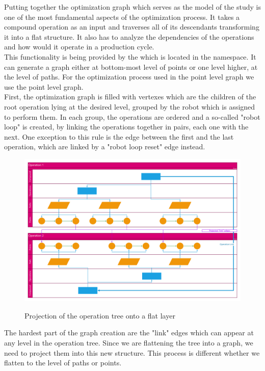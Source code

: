 Putting together the optimization graph which serves as the model of the study is one of the most fundamental aspects of the optimization process. It takes a compound operation as an input and traverses all of its descendants transforming it into a flat structure. It also has to analyze the dependencies of the operations and how would it operate in a production cycle. \\

This functionality is being provided by the  which is located in the  namespace. It can generate a graph either at bottom-most level of points or one level higher, at the level of paths. For the optimization process used in the point level graph we use the point level graph.\\

First, the optimization graph is filled with vertexes which are the children of the root operation lying at the desired level, grouped by the robot which is assigned to perform them. In each group, the operations are ordered and a so-called "robot loop" is created, by linking the operations together in pairs, each one with the next. One exception to this rule is the edge between the first and the last operation, which are linked by a "robot loop reset" edge instead. \\

\begin{figure}[H]
	\caption{Projection of the operation tree onto a flat layer}
	\centering
	\includegraphics[width=1\textwidth]{graphprojection.pdf}
	\label{fig:GraphProjection}
\end{figure}

The hardest part of the graph creation are the "link" edges which can appear at any level in the operation tree. Since we are flattening the tree into a graph, we need to project them into this new structure. 
This process is different whether we flatten to the level of paths or points.  \\

